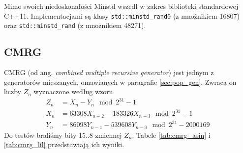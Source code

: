 \documentclass[a4paper,11pt,twoside]{book}
\theoremstyle{definition}
\begin{document}
Mimo swoich niedoskonałości Minstd wszedł w zakres biblioteki standardowej C++11. Implementacjami są klasy \texttt{std::minstd\_rand0} (z mnożnikiem 16807) oraz \texttt{std::minstd\_rand} (z mnożnikiem 48271).


\FloatBarrier
\subsection{CMRG}
CMRG (od ang. \textit{combined multiple recursive generator}) jest jednym z generatorów mieszanych, omawianych w paragrafie \ref{sec:pop_gen}. Zwraca on liczby $Z_n$ wyznaczone według wzoru
\begin{equation}
 \begin{split}
    Z_n &= X_n - Y_n \mod 2^{31}-1 \\
    X_n &= 63308 X_{n-2} - 183326 X_{n-3} \mod 2^{31}-1 \\
    Y_n &= 86098 Y_{n-1} - 539608 Y_{n-3} \mod 2^{31} - 2000169
 \end{split}
\end{equation}
Do testów braliśmy bity 15..8 zmiennej $Z_n$. Tabele \ref{tab:cmrg_asin} i \ref{tab:cmrg_lil} przedstawiają ich wyniki.
\end{document}
